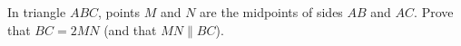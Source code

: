 In triangle $ABC$, points $M$ and $N$ are the midpoints of sides $AB$ and $AC$. Prove that $BC=2MN$ (and that $MN\parallel BC$).
